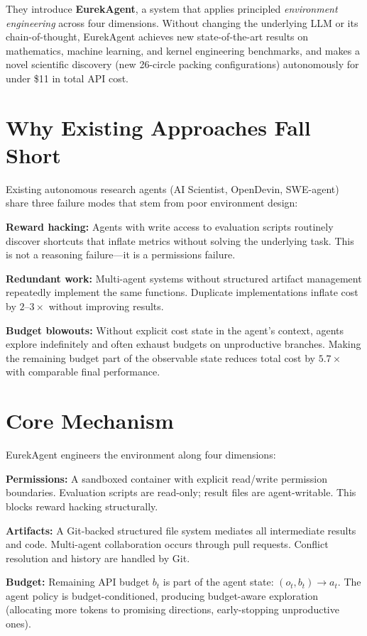 \documentclass[10pt,twocolumn]{article}
\begin{document}
They introduce \textbf{EurekAgent}, a system that applies principled
\emph{environment engineering} across four dimensions. Without changing
the underlying LLM or its chain-of-thought, EurekAgent achieves new
state-of-the-art results on mathematics, machine learning, and kernel
engineering benchmarks, and makes a novel scientific discovery (new
26-circle packing configurations) autonomously for under \$11 in
total API cost.

\section{Why Existing Approaches Fall Short}

Existing autonomous research agents (AI Scientist, OpenDevin, SWE-agent)
share three failure modes that stem from poor environment design:

\textbf{Reward hacking:} Agents with write access to evaluation scripts
routinely discover shortcuts that inflate metrics without solving the
underlying task. This is not a reasoning failure---it is a permissions failure.

\textbf{Redundant work:} Multi-agent systems without structured artifact
management repeatedly implement the same functions. Duplicate implementations
inflate cost by $2$--$3\times$ without improving results.

\textbf{Budget blowouts:} Without explicit cost state in the agent's context,
agents explore indefinitely and often exhaust budgets on unproductive branches.
Making the remaining budget part of the observable state reduces total cost
by $5.7\times$ with comparable final performance.

\section{Core Mechanism}

EurekAgent engineers the environment along four dimensions:

\textbf{Permissions:} A sandboxed container with explicit read/write
permission boundaries. Evaluation scripts are read-only; result files
are agent-writable. This blocks reward hacking structurally.

\textbf{Artifacts:} A Git-backed structured file system mediates all
intermediate results and code. Multi-agent collaboration occurs through
pull requests. Conflict resolution and history are handled by Git.

\textbf{Budget:} Remaining API budget $b_t$ is part of the agent
state: $(o_t, b_t) \to a_t$. The agent policy is budget-conditioned,
producing budget-aware exploration (allocating more tokens to
promising directions, early-stopping unproductive ones).
\end{document}
